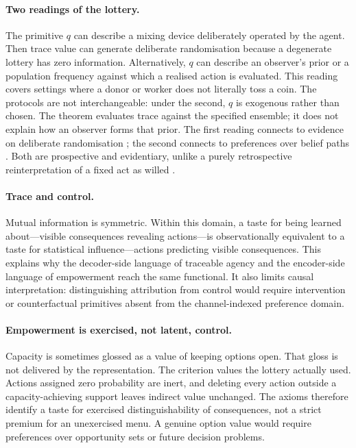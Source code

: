 \documentclass[11pt,a4paper]{article}
\theoremstyle{definition}
\newcommand{\1}{\mathbf 1}
\begin{document}
\paragraph{Two readings of the lottery.}
The primitive $q$ can describe a mixing device deliberately operated by the agent.  Then trace value can generate
deliberate randomisation because a degenerate lottery has zero information.  Alternatively, $q$ can describe an
observer's prior or a population frequency against which a realised action is evaluated.  This reading covers settings
where a donor or worker does not literally toss a coin.  The protocols are not interchangeable: under the second,
$q$ is exogenous rather than chosen.  The theorem evaluates trace against the specified ensemble; it does not explain
how an observer forms that prior.  The first reading connects to evidence on deliberate randomisation
\cite{AgranovOrtoleva2017}; the second connects to preferences over belief paths \cite{ElyFrankelKamenica2015}.  Both
are prospective and evidentiary, unlike a purely retrospective reinterpretation of a fixed act as willed
\cite{Nietzsche1883}.

\paragraph{Trace and control.}
Mutual information is symmetric.  Within this domain, a taste for being learned about---visible consequences revealing
actions---is observationally equivalent to a taste for statistical influence---actions predicting visible consequences.
This explains why the decoder-side language of traceable agency and the encoder-side language of empowerment reach the
same functional.  It also limits causal interpretation: distinguishing attribution from control would require
intervention or counterfactual primitives absent from the channel-indexed preference domain.

\paragraph{Empowerment is exercised, not latent, control.}
Capacity is sometimes glossed as a value of keeping options open.  That gloss is not delivered by the representation.
The criterion values the lottery actually used.  Actions assigned zero probability are inert, and deleting every
action outside a capacity-achieving support leaves indirect value unchanged.  The axioms therefore identify a taste
for exercised distinguishability of consequences, not a strict premium for an unexercised menu.  A genuine option
value would require preferences over opportunity sets or future decision problems.
\end{document}
